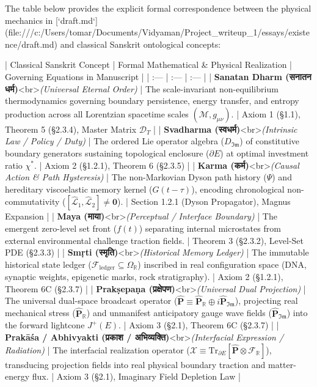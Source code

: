 \documentclass[11pt,a4paper]{article}
\theoremstyle{definition}
\theoremstyle{remark}
\begin{document}
The table below provides the explicit formal correspondence between the physical mechanics in [`draft.md`](file:///c:/Users/tomar/Documents/Vidyaman/Project_writeup_1/essays/existence/draft.md) and classical Sanskrit ontological concepts:

| Classical Sanskrit Concept | Formal Mathematical \& Physical Realization | Governing Equations in Manuscript |
| :--- | :--- | :--- |
| \textbf{Sanatan Dharm (सनातन धर्म)}<br>\textit{(Universal Eternal Order)} | The scale-invariant non-equilibrium thermodynamics governing boundary persistence, energy transfer, and entropy production across all Lorentzian spacetime scales $(\mathcal{M}, g_{\mu\nu})$. | Axiom 1 (§1.1), Theorem 5 (§2.3.4), Master Matrix $\mathcal{D}_T$ |
| \textbf{Svadharma (स्वधर्म)}<br>\textit{(Intrinsic Law / Policy / Duty)} | The ordered Lie operator algebra ($D_{\mathfrak{Im}}$) of constitutive boundary generators sustaining topological enclosure ($\partial E$) at optimal investment ratio $\chi^*$. | Axiom 2 (§1.2.1), Theorem 6 (§2.3.5) |
| \textbf{Karma (कर्म)}<br>\textit{(Causal Action \& Path Hysteresis)} | The non-Markovian Dyson path history ($\Psi$) and hereditary viscoelastic memory kernel ($G(t-\tau)$), encoding chronological non-commutativity ($[\hat{\mathcal{L}}_1, \hat{\mathcal{L}}_2] \neq \mathbf{0}$). | Section 1.2.1 (Dyson Propagator), Magnus Expansion |
| \textbf{Maya (माया)}<br>\textit{(Perceptual / Interface Boundary)} | The emergent zero-level set front ($f(t)$) separating internal microstates from external environmental challenge traction fields. | Theorem 3 (§2.3.2), Level-Set PDE (§2.3.3) |
| \textbf{Smṛti (स्मृति)}<br>\textit{(Historical Memory Ledger)} | The immutable historical state ledger ($\mathcal{F}_{\text{ledger}} \subseteq \Omega_{\mathbb{R}}$) inscribed in real configuration space (DNA, synaptic weights, epigenetic marks, rock stratigraphy). | Axiom 2 (§1.2.1), Theorem 6C (§2.3.7) |
| \textbf{Prakṣepaṇa (प्रक्षेपण)}<br>\textit{(Universal Dual Projection)} | The universal dual-space broadcast operator ($\hat{\mathbf{P}} \equiv \hat{\mathbf{P}}_{\mathbb{R}} \oplus i \hat{\mathbf{P}}_{\mathfrak{Im}}$), projecting real mechanical stress ($\hat{\mathbf{P}}_{\mathbb{R}}$) and unmanifest anticipatory gauge wave fields ($\hat{\mathbf{P}}_{\mathfrak{Im}}$) into the forward lightcone $J^+(E)$. | Axiom 3 (§2.1), Theorem 6C (§2.3.7) |
| \textbf{Prakāśa / Abhivyakti (प्रकाश / अभिव्यक्ति)}<br>\textit{(Interfacial Expression / Radiation)} | The interfacial realization operator ($\boldsymbol{\mathcal{X}} \equiv \mathrm{Tr}_{\partial E}[\hat{\mathbf{P}} \otimes \mathcal{F}_{\mathbb{R}}]$), transducing projection fields into real physical boundary traction and matter-energy flux. | Axiom 3 (§2.1), Imaginary Field Depletion Law |
\end{document}
